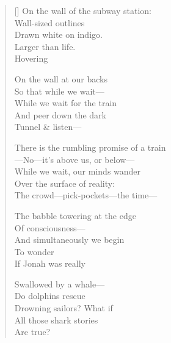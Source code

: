 \label{ch:dolphins_eels_sea_turtles}
\settowidth{\versewidth}{          On the wall of the subway station:}
\begin{verse}[\versewidth]
          On the wall of the subway station:\\
Wall-sized outlines\\
Drawn white on indigo.\\
Larger than life.\\
Hovering

On the wall at our backs\\
So that while we wait---\\
While we wait for the train\\
And peer down the dark\\
Tunnel \& listen---

There is the rumbling promise of a train\\
---No---it's above us, or below---\\
While we wait, our minds wander\\
Over the surface of reality:\\
The crowd---pick-pockets---the time---

The babble towering at the edge\\
Of consciousness---\\
And simultaneously we begin\\
To wonder\\
If Jonah was really

Swallowed by a whale---\\
Do dolphins rescue\\
Drowning sailors?     What if\\
All those shark stories\\
Are true?
\end{verse}
